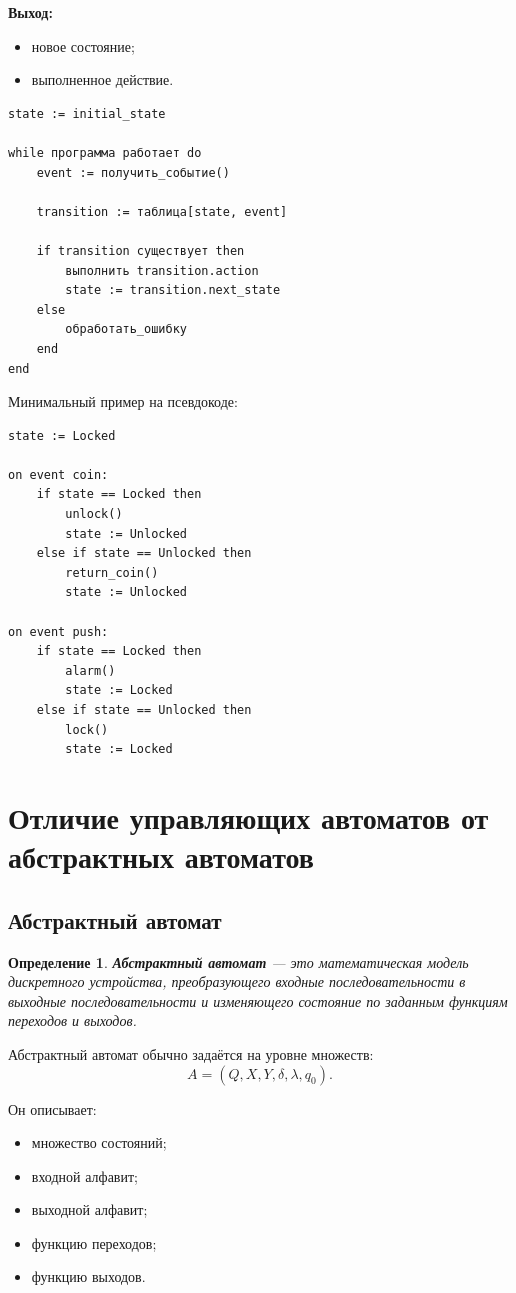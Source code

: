 \documentclass[12pt,a4paper]{article}
\newtheorem{definition}{Определение}
\begin{document}
\textbf{Выход:}
\begin{itemize}
    \item новое состояние;
    \item выполненное действие.
\end{itemize}

\begin{lstlisting}[style=pseudo]
state := initial_state

while программа работает do
    event := получить_событие()

    transition := таблица[state, event]

    if transition существует then
        выполнить transition.action
        state := transition.next_state
    else
        обработать_ошибку
    end
end
\end{lstlisting}

Минимальный пример на псевдокоде:

\begin{lstlisting}[style=pseudo]
state := Locked

on event coin:
    if state == Locked then
        unlock()
        state := Unlocked
    else if state == Unlocked then
        return_coin()
        state := Unlocked

on event push:
    if state == Locked then
        alarm()
        state := Locked
    else if state == Unlocked then
        lock()
        state := Locked
\end{lstlisting}

\section{Отличие управляющих автоматов от абстрактных автоматов}

\subsection{Абстрактный автомат}

\begin{definition}
\textbf{Абстрактный автомат} --- это математическая модель дискретного устройства, преобразующего входные последовательности в выходные последовательности и изменяющего состояние по заданным функциям переходов и выходов.
\end{definition}

Абстрактный автомат обычно задаётся на уровне множеств:
\[
    A = (Q, X, Y, \delta, \lambda, q_0).
\]

Он описывает:
\begin{itemize}
    \item множество состояний;
    \item входной алфавит;
    \item выходной алфавит;
    \item функцию переходов;
    \item функцию выходов.
\end{itemize}
\end{document}
